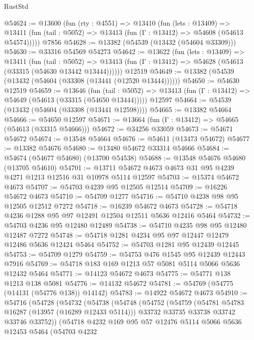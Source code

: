 \begin{lexlean}{RustStd}
\begin{coremodule}
@54624 := @13600
    (fun (rty : @4551) =>
    @13410
      (fun (lets : @13409) =>
      @13411 (fun (tail : @5052) => @13413 (fun (Γ : @13412) => @54608 (@54613 @54574)))))
    @7856
@54628 := @13382 (@54539 (@13432 (@54604 @33309)))
@54630 := @33316 @54569 @54273
@54642 := @13622
    (fun (lets : @13409) =>
    @13411
      (fun (tail : @5052) =>
      @13413 (fun (Γ : @13412) => @54628 (@54613 (@33315 (@54630 @13442 @13444))))))
    @12519
@54649 := @13382 (@54539 (@13432 (@54604 (@33308 (@13441 (@12520 @13444))))))
@54650 := @54630 @12519
@54659 := @13646
    (fun (tail : @5052) => @13413 (fun (Γ : @13412) => @54649 (@54613 (@33315 (@54650 @13444)))))
    @12597
@54664 := @54539 (@13432 (@54604 (@33308 (@13441 @12598))))
@54665 := @13382 @54664
@54666 := @54650 @12597
@54671 := @13664 (fun (Γ : @13412) => @54665 (@54613 (@33315 @54666)))
@54672 := @34256 @33059
@54673 := @54671 @54672
@54674 := @13548 @54664
@54676 := @54611 (@13473 @54672)
@54677 := @13382 @54676
@54680 := @13480 @54672 @33314 @54666
@54684 := @54674 (@54677 @54680) (@13700 @54538)
@54688 := @13548 @54676 @54680 (@13705 @54610)
@54701 := @13711 @54672 @4673 @4673 @31 @95 @4239 @4271 @1213 @12516 @31 @10978 @5114 @12597
@54703 := @15374 @54672 @4673
@54707 := @54703 @4239 @95 @12505 @12514
@54709 := @16226 @54672 @4673
@54710 := @54709 @1277
@54716 := @54710 @4238 @98 @95 @12505 @12512 @7272
@54718 := @16239 @54672 @4673
@54728 := @54718 @4236 @1288 @95 @97 @12491 @12504 @12511 @5636 @12416 @5464
@54732 := @54703 @4236 @95 @12480 @12489
@54738 := @54710 @4235 @98 @95 @12480 @12487 @7272
@54748 := @54718 @1281 @4234 @95 @97 @12447 @12479 @12486 @5636 @12424 @5464
@54752 := @54703 @1281 @95 @12439 @12445
@54753 := @54709 @1279
@54759 := @54753 @476 @1545 @95 @12439 @12443 @7916
@54769 := @54718 @183 @169 @1213 @57 @5081 @5114 @5066 @5636 @12432 @5464
@54771 := @14123 @54672 @4673
@54775 := @54771 @138 @1213 @138 @5081
@54776 := @14132 @54672
@54781 := @54769 (@54775 (@14131 (@54776 @138)) @14142)
@54783 := @14922 @54672 @4673
@54910 := @54716
    (@54728
      (@54732
        (@54738
          (@54748
            (@54752
              (@54759
                (@54781 @54783 @16287 (@13957 (@16289 @12433 @5114)))
                @33732
                @33735
                @33738
                @33742
                @33746
                @33752))
            (@54718
              @4232
              @169
              @95
              @57
              @12476
              @5114
              @5066
              @5636
              @12453
              @5464
              (@54703
                @4232

\end{coremodule}
\end{lexlean}
